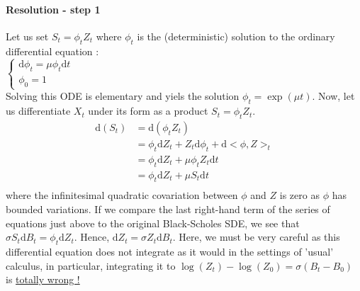 \paragraph{Resolution - step 1}
Let us set $S_t = \phi_t Z_t$ where $\phi_t$ is the (deterministic) solution to the ordinary differential equation :
\\
$\left\{
\begin{array}{l}
\mathrm{d}\phi_t = \mu \phi_t \mathrm{d}t\\
\phi_0 = 1
\end{array}
\right.$ \\ Solving this ODE is elementary and yiels the solution $\phi_t = \exp(\mu t)$. Now, let us differentiate $X_t$ under its form as a product  $S_t = \phi_t Z_t$. \\
\begin{equation}
\begin{alignat*}{2}
\mathrm{d}(S_t) &= \mathrm{d}(\phi_t Z_t)\\ 
&= \phi_t \mathrm{d}Z_t + Z_t \mathrm{d}\phi_t + \mathrm{d}<\phi,Z>_t\\ 
&= \phi_t \mathrm{d}Z_t + \mu \phi_t Z_t \mathrm{d}t\\
&= \phi_t \mathrm{d}Z_t + \mu S_t \mathrm{d}t\\
\end{alignat*}
\end{equation} where the infinitesimal quadratic covariation between $\phi$ and $Z$ is zero as $\phi$ has bounded variations. If we compare the last right-hand term of the series of equations just above to the original Black-Scholes SDE, we see that $\sigma S_t \mathrm{d}B_t = \phi_t \mathrm{d}Z_t$. Hence, $\mathrm{d}Z_t = \sigma Z_t \mathrm{d}B_t$. Here, we must be very careful as this differential equation does not integrate as it would in the settings of 'usual' calculus, in particular, integrating it to $\log(Z_t) - \log(Z_0) = \sigma (B_t - B_0)$ is \underline{totally wrong !}

